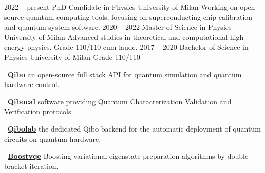 \documentclass[9pt]{developercv} %
\begin{document}


\begin{entrylist}
	\entry
		{2022 -- present}
		{PhD Candidate in Physics}
		{University of Milan}
		{Working on open-source quantum computing tools, focusing on superconducting
        chip calibration and quantum system software.}
	\entry
		{2020 -- 2022}
		{Master of Science in Physics}
		{University of Milan}
        {Advanced studies in theoretical and computational high energy physics.
        Grade 110/110 cum laude.}
	\entry
		{2017 -- 2020}
		{Bachelor of Science in Physics}
		{University of Milan}
		{Grade 110/110}
\end{entrylist}

\begin{entrylist}
	\entry
		{}
        {\faGithub~\href{https://github.com/qiboteam/qibo}{\textbf{Qibo}}}
		{}
        {an open-source full stack API for quantum simulation and quantum hardware control.}

    \entry
        {}
        {\faGithub~\href{https://github.com/qiboteam/qibocal}{\textbf{Qibocal}}}
        {}
        {software providing Quantum Characterization Validation and Verification protocols. }

    \entry
        {}
        {\faGithub~\href{https://github.com/qiboteam/qibolab}{\textbf{Qibolab}}}
        {}
        {the dedicated Qibo backend for the automatic deployment of quantum circuits on quantum hardware. }

    \entry
        {}
        {\faGithub~\href{https://github.com/qiboteam/boostvqe}{\textbf{Boostvqe}}}
        {}
        {Boosting variational eigenstate preparation algorithms by double-bracket iteration.}

\end{entrylist}

\end{document}
